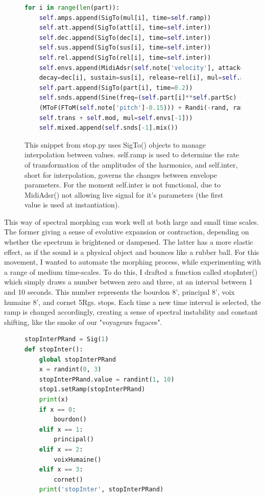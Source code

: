 \documentclass[12pt,twoside,maitrise]{dms_ks}
\theoremstyle{definition}
\begin{document}
{\begin{figure}[H]
\begin{lstlisting}[language=Python]
for i in range(len(part)):
    self.amps.append(SigTo(mul[i], time=self.ramp))
    self.att.append(SigTo(att[i], time=self.inter))
    self.dec.append(SigTo(dec[i], time=self.inter))
    self.sus.append(SigTo(sus[i], time=self.inter))
    self.rel.append(SigTo(rel[i], time=self.inter))
    self.envs.append(MidiAdsr(self.note['velocity'], attack=att[i],
    decay=dec[i], sustain=sus[i], release=rel[i], mul=self.amps[-1]))
    self.part.append(SigTo(part[i], time=0.2))
    self.snds.append(Sine(freq=(self.part[i]**self.partSc) * 
    (MToF(FToM(self.note['pitch']-0.15))) + Randi(-rand, rand, 5) + 
    self.trans + self.mod, mul=self.envs[-1]))
    self.mixed.append(self.snds[-1].mix())
\end{lstlisting}
\caption{This snippet from stop.py uses SigTo() objects to manage interpolation between values.
self.ramp is used to determine the rate of transformation of the amplitudes of the harmonics, and self.inter, short for interpolation, governs the changes between envelope parameters.
For the moment self.inter is not functional, due to MidiAdsr() not allowing live signal for it's parameters (the first value is used at instantiation).} 
\end{figure}

This way of spectral morphing can work well at both large and small time scales.
The former giving a sense of evolutive expansion or contraction, depending on whether the spectrum is brightened or dampened.
The latter has a more elastic effect, as if the sound is a physical object and bounces like a rubber ball.
For this movement, I wanted to automate the morphing process, while experimenting with a range of medium time-scales.
To do this, I drafted a function called stopInter() which simply draws a number between zero and three, at an interval between 1 and 10 seconds.
This number represents the bourdon 8', principal 8', voix humaine 8', and cornet 5Rgs.
stops.
Each time a new time interval is selected, the ramp is changed accordingly, creating a sense of spectral instability and constant shifting, like the smoke of our "voyageurs fugaces".

\begin{figure}[H]
\begin{lstlisting}[language=Python]
stopInterPRand = Sig(1)
def stopInter():
    global stopInterPRand
    x = randint(0, 3)
    stopInterPRand.value = randint(1, 10)
    stop1.setRamp(stopInterPRand)
    print(x)
    if x == 0:
        bourdon()
    elif x == 1:
        principal()
    elif x == 2:
        voixHumaine()
    elif x == 3:
        cornet()
    print('stopInter', stopInterPRand)


\end{lstlisting}
\end{figure}}
\end{document}
